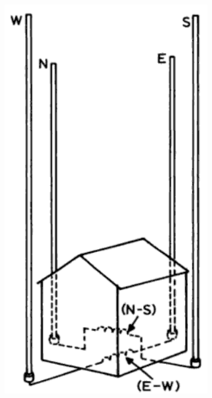 \begin{figure}
  \centering
  \begin{subfigure}[b]{0.25\textwidth}
    \includegraphics[width=\textwidth]{./img/lit_review/adcock_model}
  \end{subfigure}
  ~
  \begin{subfigure}[b]{0.6\textwidth}

\end{subfigure}
\end{figure}
